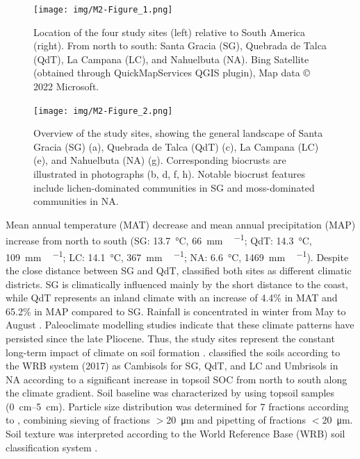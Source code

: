 \begin{figure}[H]
	\centering
	\texttt{[image: img/M2-Figure\_1.png]}
	\caption{Location of the four study sites (left) relative to South America (right). From north to south: Santa Gracia (SG), Quebrada de Talca (QdT), La Campana (LC), and Nahuelbuta (NA). Bing Satellite (obtained through QuickMapServices QGIS plugin), Map data $©$2022 Microsoft.}
	\label{fig:M2-F1}
\end{figure}

\FloatBarrier

\begin{figure}[H]
	\centering
	\texttt{[image: img/M2-Figure\_2.png]}
	\caption{Overview of the study sites, showing the general landscape of Santa Gracia (SG) (a), Quebrada de Talca (QdT) (c), La Campana (LC) (e), and Nahuelbuta (NA) (g). Corresponding biocrusts are illustrated in photographs (b, d, f, h). Notable biocrust features include lichen-dominated communities in SG and moss-dominated communities in NA.}
	\label{fig:M2-F2}
\end{figure}

\FloatBarrier

Mean annual temperature (MAT) decrease and mean annual precipitation (MAP) increase from north to south (SG: \SI{13.7}{\degreeCelsius}, \SI{66}{\milli\metre\,\year^{-1}}; QdT: \SI{14.3}{\degreeCelsius}, \SI{109}{\milli\metre\,\year^{-1}}; LC: \SI{14.1}{\degreeCelsius}, \SI{367}{\milli\metre\,\year^{-1}}; NA: \SI{6.6}{\degreeCelsius}, \SI{1469}{\milli\metre\,\year^{-1}}). Despite the close distance between SG and QdT, \citet{Santibnez2017} classified both sites as different climatic districts. SG is climatically influenced mainly by the short distance to the coast, while QdT represents an inland climate with an increase of 4.4\% in MAT and 65.2\% in MAP compared to SG. Rainfall is concentrated in winter from May to August \citep{Bernhard2018,Canessa2020}. Paleoclimate modelling studies \citep{Mutz2018} indicate that these climate patterns have persisted since the late Pliocene. Thus, the study sites represent the constant long-term impact of climate on soil formation \citep{Ewing2006}. \citet{Bernhard2018} classified the soils according to the WRB system (2017) as Cambisols for SG, QdT, and LC and Umbrisols in NA according to a significant increase in topsoil SOC from north to south along the climate gradient. Soil baseline was characterized by \citet{RiverasMunoz2022} using topsoil samples (\SIrange[range-phrase=--,range-units=single]{0}{5}{\centi\meter}). Particle size distribution was determined for 7 fractions according to \citet{Kohn1929}, combining sieving of fractions $>$\SI{20}{\micro\meter} and pipetting of fractions $<$\SI{20}{\micro\meter}. Soil texture was interpreted according to the World Reference Base (WRB) soil classification system \citep{Jahn2006}.


